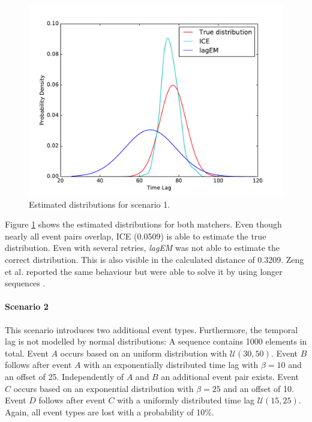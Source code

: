 \documentclass[conference]{IEEEtran}
\theoremstyle{examplestyle}
\begin{document}
\begin{figure}[!tb]
	\centering
	\includegraphics[scale=0.4]{images/scenarios/1.pdf}
	\caption{Estimated distributions for scenario 1.}
	\label{fig:scen1}
\end{figure}

Figure \ref{fig:scen1} shows the estimated distributions for both matchers. Even though nearly all event pairs overlap, \ac{ICE} (0.0509) is able to estimate the true distribution. Even with several retries, \textit{lagEM} was not able to estimate the correct distribution. This is also visible in the calculated distance of 0.3209. Zeng et al. reported the same behaviour but were able to solve it by using longer sequences \cite{Zeng2015}.



\paragraph{Scenario 2}
This scenario introduces two additional event types. Furthermore, the temporal lag is not modelled by normal distributions: A sequence contains 1000 elements in total. Event \(A\) occurs based on an uniform distribution with \(\mathcal{U}(30, 50)\). Event \(B\) follows after event \(A\) with an exponentially distributed time lag with \(\beta = 10\) and an offset of 25. Independently of \(A\) and \(B\) an additional event pair exists. Event \(C\) occurs based on an exponential distribution with \(\beta = 25\) and an offset of 10. Event \(D\) follows after event \(C\) with a uniformly distributed time lag \(\mathcal{U}(15, 25)\). Again, all event types are lost with a probability of 10\%.
\end{document}
